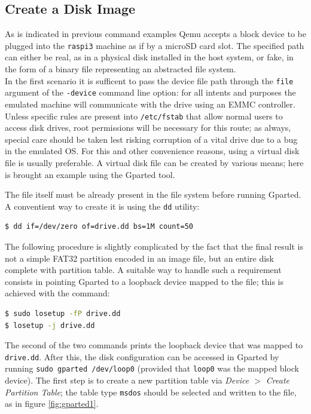 \documentclass[12pt,a4paper,openright,twoside]{report}
\begin{document}
\subsection{Create a Disk Image}
As is indicated in previous command examples Qemu accepts a block device to be 
plugged into the {\tt raspi3} machine as if by a microSD card slot.
The specified path can either be real, as in a physical disk installed in the 
host system, or fake, in the form of a binary file representing an abstracted 
file system.\\
In the first scenario it is sufficent to pass the device file path through the
{\tt file} argument of the {\tt -device} command line option: for all intents and purposes
the emulated machine will communicate with the drive using an EMMC controller.
Unless specific rules are present into {\tt /etc/fstab} that allow normal users 
to access disk drives, root permissions will be necessary for this route; as always, special
care should be taken lest risking corruption of a vital drive due to a bug in the emulated OS.
For this and other convenience reasons, using a virtual disk file is usually preferable. A 
virtual disk file can be created by various means; here is brought an example 
using the Gparted tool.

The file itself must be already present in the file system before running Gparted. 
A conventient way to create it is using the {\tt dd} utility:

\begin{lstlisting}[language=sh]
$ dd if=/dev/zero of=drive.dd bs=1M count=50
\end{lstlisting}

The following procedure is slightly complicated by the fact that the final result
is not a simple FAT32 partition encoded in an image file, but an entire disk complete
with partition table. A suitable way to handle such a requirement consists in pointing
Gparted to a loopback device mapped to the file; this is achieved with the command:

\begin{lstlisting}[language=sh]
$ sudo losetup -fP drive.dd
$ losetup -j drive.dd
\end{lstlisting}

The second of the two commands prints the loopback device that was mapped to 
{\tt drive.dd}.
After this, the disk configuration can be accessed in Gparted by running 
{\tt sudo gparted /dev/loop0} (provided that {\tt loop0} was the mapped block
device).
The first step is to create a new partition table via \textit{Device $>$ Create
Partition Table}; the table type {\tt msdos} should be selected and written to the
file, as in figure \ref{fig:gparted1}.
\end{document}
